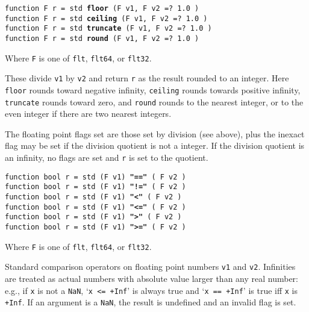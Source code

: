 \documentclass[12pt]{article}
\newcommand{\ttkey}[1]{{\tt \bfseries #1}}
\newenvironment{indpar}[1][0.3in]%
	{\begin{list}{}%
		     {\setlength{\itemsep}{0in}%
		      \setlength{\topsep}{0in}%
		      \setlength{\parsep}{1ex}%
		      \setlength{\labelwidth}{#1}%
		      \setlength{\leftmargin}{#1}%
		      \addtolength{\leftmargin}{\labelsep}}%
	 \item}%
	{\end{list}}
\begin{document}
{\tt function F r = std \ttkey{floor} (F v1, F v2 =? 1.0 )} \\
{\tt function F r = std \ttkey{ceiling} (F v1, F v2 =? 1.0 )} \\
{\tt function F r = std \ttkey{truncate} (F v1, F v2 =? 1.0 )} \\
{\tt function F r = std \ttkey{round} (F v1, F v2 =? 1.0 )}
\begin{indpar}
Where {\tt F} is one of {\tt flt}, {\tt flt64}, or {\tt flt32}.

These divide {\tt v1} by {\tt v2} and return {\tt r} as the
result rounded to an integer.
Here {\tt floor} rounds toward negative infinity, {\tt ceiling}
rounds towards positive infinity, {\tt truncate} rounds toward
zero, and {\tt round} rounds to the nearest integer, or to the
even integer if there are two nearest integers.

The floating point flags set are those set by division (see above), plus the
inexact flag may be set if the division quotient is not a integer.
If the division quotient is an infinity, no flags are set and {\tt r}
is set to the quotient.
\end{indpar}

{\tt function bool r = std (F v1) \ttkey{"=="} ( F v2 )} \\
{\tt function bool r = std (F v1) \ttkey{"!="} ( F v2 )} \\
{\tt function bool r = std (F v1) \ttkey{"<"} ( F v2 )} \\
{\tt function bool r = std (F v1) \ttkey{"<="} ( F v2 )} \\
{\tt function bool r = std (F v1) \ttkey{">"} ( F v2 )} \\
{\tt function bool r = std (F v1) \ttkey{">="} ( F v2 )}
\begin{indpar}
Where {\tt F} is one of {\tt flt}, {\tt flt64}, or {\tt flt32}.

Standard comparison operators on floating point numbers {\tt v1} and {\tt v2}.
Infinities are treated as actual numbers with absolute value
larger than any real number: e.g., if {\tt x} is not a {\tt NaN},
`{\tt x <= +Inf}' is always
true and `{\tt x == +Inf}' is true iff {\tt x} is {\tt +Inf}.
If an argument is a {\tt NaN}, the result is undefined and an invalid
flag is set.
\end{indpar}
\end{document}
